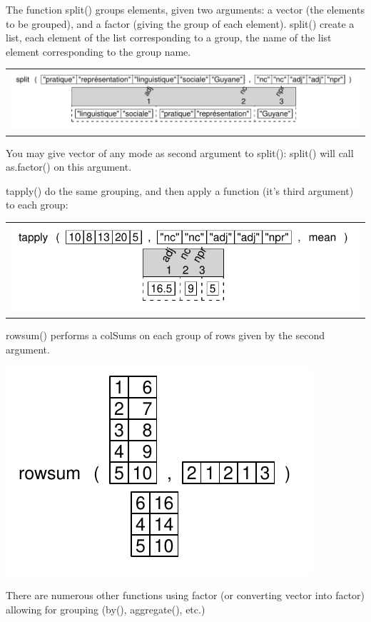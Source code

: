 \documentclass[pdflatex]{article}
\begin{document}
The function split() groups elements, given two arguments: a vector (the
elements to be grouped), and a factor (giving the group of each element).
split() create a list, each element of the list corresponding to a group, the
name of the list element corresponding to the group name.

\begin{tabular}{c}
\includegraphics{split2}
\end{tabular}

You may give vector of any mode as second argument to split(): split() will
call as.factor() on this argument.

tapply() do the same grouping, and then apply a function (it's third argument)
to each group:

\begin{tabular}{c}
\includegraphics{tapply}
\end{tabular}

rowsum() performs a colSums on each group of rows given by the second argument.

\includegraphics{rowsum} 

There are numerous other functions using factor (or converting vector into
factor) allowing for grouping (by(), aggregate(), etc.)
\end{document}
